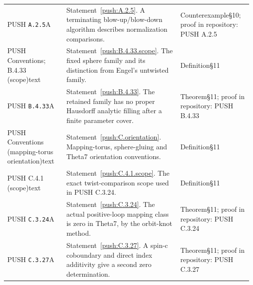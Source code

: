 \begin{longtable}{@{}L{.18\linewidth}L{.48\linewidth}L{.29\linewidth}@{}}
PUSH \nolinkurl{A.2.5}\newline A & Statement~\ref{push:A.2.5}. A terminating blow-up/\allowbreak{}blow-down algorithm describes normalization comparisons.\newline {} & Counterexample\newline §10; proof in repository:\allowbreak{} PUSH A.2.5\\
PUSH Conventions; B.4.33 (scope)\newline text & Statement~\ref{push:B.4.33.scope}. The fixed sphere family and its distinction from Engel’s untwisted family.\newline {} & Definition\newline §11\\
PUSH \nolinkurl{B.4.33}\newline A & Statement~\ref{push:B.4.33}. The retained family has no proper Hausdorff analytic filling after a finite parameter cover.\newline {} & Theorem\newline §11; proof in repository:\allowbreak{} PUSH B.4.33\\
PUSH Conventions (mapping-torus orientation)\newline text & Statement~\ref{push:C.orientation}. Mapping-torus, sphere-gluing and Theta7 orientation conventions.\newline {} & Definition\newline §11\\
PUSH C.4.1 (scope)\newline text & Statement~\ref{push:C.4.1.scope}. The exact twist-comparison scope used in PUSH C.3.24.\newline {} & Definition\newline §11\\
PUSH \nolinkurl{C.3.24}\newline A & Statement~\ref{push:C.3.24}. The actual positive-loop mapping class is zero in Theta7, by the orbit-knot method.\newline {} & Theorem\newline §11; proof in repository:\allowbreak{} PUSH C.3.24\\
PUSH \nolinkurl{C.3.27}\newline A & Statement~\ref{push:C.3.27}. A spin-c coboundary and direct index additivity give a second zero determination.\newline {} & Theorem\newline §11; proof in repository:\allowbreak{} PUSH C.3.27\\

\end{longtable}
